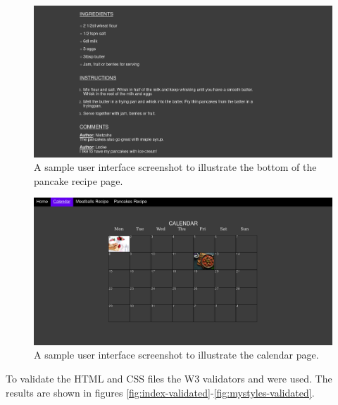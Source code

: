 \documentclass[a4paper]{scrartcl}
\begin{document}
\begin{figure}[h!]
    \begin{center}
        \includegraphics[scale=0.2]{images/pancake-text.png}
        \caption{A sample user interface screenshot to illustrate the bottom of the pancake recipe page.}
        \label{fig:pancake-text}
    \end{center}
\end{figure}

\begin{figure}[h!]
    \begin{center}
        \includegraphics[scale=0.2]{images/calendar.png}
        \caption{A sample user interface screenshot to illustrate the calendar page.}
        \label{fig:calendar}
    \end{center}
\end{figure}

To validate the HTML and CSS files the W3 validators \citet{noauthor_w3c_nodate} and \citet{noauthor_w3c_nodate-1} were used. The results are shown in figures \ref{fig:index-validated}-\ref{fig:mystyles-validated}.
\end{document}

